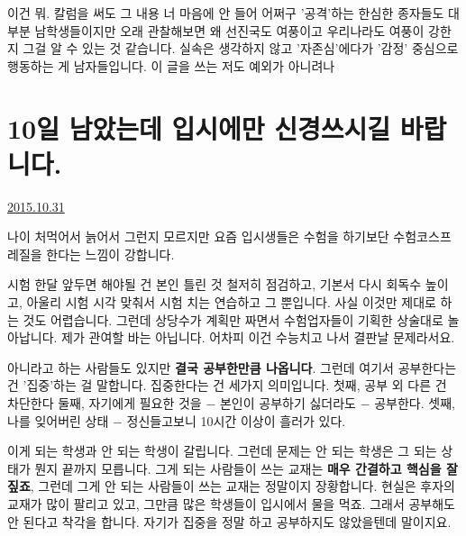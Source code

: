 이건 뭐. 칼럼을 써도 그 내용 너 마음에 안 들어 어쩌구 '공격'하는 한심한 종자들도 대부분 남학생들이지만
오래 관찰해보면 왜 선진국도 여풍이고 우리나라도 여풍이 강한지 그걸 알 수 있는 것 같습니다.
실속은 생각하지 않고 '자존심'에다가 '감정' 중심으로 행동하는 게 남자들입니다. 이 글을 쓰는 저도 예외가 아니려나
\vspace{5mm}














\section{10일 남았는데 입시에만 신경쓰시길 바랍니다.}
\href{https://www.kockoc.com/Apoc/456618}{2015.10.31}

\vspace{5mm}

나이 처먹어서 늙어서 그런지 모르지만
요즘 입시생들은 수험을 하기보단 수험코스프레질을 한다는 느낌이 강합니다.
\vspace{5mm}

시험 한달 앞두면 해야될 건 본인 틀린 것 철저히 점검하고, 기본서 다시 회독수 높이고,
아울리 시험 시각 맞춰서 시험 치는 연습하고 그 뿐입니다. 사실 이것만 제대로 하는 것도 어렵습니다.
그런데 상당수가 계획만 짜면서 수험업자들이 기획한 상술대로 놀아납니다.
제가 관여할 바는 아닙니다. 어차피 이건 수능치고 나서 결판날 문제라서요.
\vspace{5mm}

아니라고 하는 사람들도 있지만 \textbf{결국 공부한만큼 나옵니다}.
그런데 여기서 공부한다는 건 '집중'하는 걸 말합니다. 집중한다는 건 세가지 의미입니다.
첫째, 공부 외 다른 건 차단한다
둘째, 자기에게 필요한 것을 $-$ 본인이 공부하기 싫더라도 $-$ 공부한다.
셋째, 나를 잊어버린 상태 $-$ 정신들고보니 10시간 이상이 흘러가 있다.
\vspace{5mm}

이게 되는 학생과 안 되는 학생이 갈립니다. 그런데 문제는 안 되는 학생은 그 되는 상태가 뭔지 끝까지 모릅니다.
그게 되는 사람들이 쓰는 교재는 \textbf{매우 간결하고 핵심을 잘 짚죠}, 그런데 그게 안 되는 사람들이 쓰는 교재는 정말이지 장황합니다.
현실은 후자의 교재가 많이 팔리고 있고, 그만큼 많은 학생들이 입시에서 물을 먹죠.
그래서 공부해도 안 된다고 착각을 합니다. 자기가 집중을 정말 하고 공부하지도 않았을텐데 말이지요.
\vspace{5mm}

